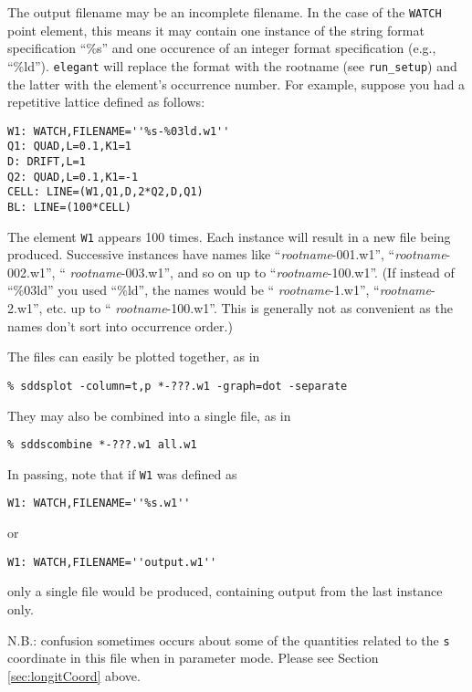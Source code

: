 The output filename may be an incomplete filename.  In the case of the
\verb|WATCH| point element, this means it may contain one instance of
the string format specification ``\%s'' and one occurence of an
integer format specification (e.g., ``\%ld'').  {\tt elegant} will
replace the format with the rootname (see
\verb|run_setup|) and the latter with the element's occurrence
number.  For example, suppose you had a repetitive lattice defined as
follows:
\begin{verbatim}
W1: WATCH,FILENAME=''%s-%03ld.w1''
Q1: QUAD,L=0.1,K1=1
D: DRIFT,L=1
Q2: QUAD,L=0.1,K1=-1
CELL: LINE=(W1,Q1,D,2*Q2,D,Q1)
BL: LINE=(100*CELL)
\end{verbatim}
The element \verb|W1| appears 100 times.  Each instance will result in
a new file being produced.  Successive instances have names like
``{\em rootname}-001.w1'', ``{\em rootname}-002.w1'', ``{\em
rootname}-003.w1'', and so on up to ``{\em rootname}-100.w1''.  (If
instead of ``\%03ld'' you used ``\%ld'', the names would be ``{\em
rootname}-1.w1'', ``{\em rootname}-2.w1'', etc. up to ``{\em
rootname}-100.w1''.  This is generally not as convenient as the names
don't sort into occurrence order.)

The files can easily be plotted together, as in 
\begin{verbatim}
% sddsplot -column=t,p *-???.w1 -graph=dot -separate 
\end{verbatim}
They may also be combined into a single file, as in
\begin{verbatim}
% sddscombine *-???.w1 all.w1 
\end{verbatim}

In passing, note that if \verb|W1| was defined as
\begin{verbatim}
W1: WATCH,FILENAME=''%s.w1''
\end{verbatim}
or 
\begin{verbatim}
W1: WATCH,FILENAME=''output.w1''
\end{verbatim}
only a single file would be produced, containing output from the last instance
only.

N.B.: confusion sometimes occurs about some of the quantities related
to the {\tt s} coordinate in this file when in parameter mode.  Please
see Section \ref{sec:longitCoord} above.
